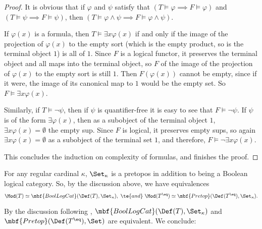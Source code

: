 \documentclass[11pt]{article}
\begin{document}
\begin{proof}
  It is obvious that if $\varphi$ and $\psi$ satisfy that $(T \models \varphi \implies F \models \varphi)$ and $(T \models \psi \implies F \models \psi)$, then $(T \models \varphi \land \psi \implies F \models \varphi \land \psi)$.

  If $\varphi(x)$ is a formula, then $T \models \exists x \varphi(x)$ if and only if the image of the projection of $\varphi(x)$ to the empty sort (which is the empty product, so is the terminal object $1$) is all of $1$. Since $F$ is a logical functor, it preserves the terminal object and all maps into the terminal object, so $F$ of the image of the projection of $\varphi(x)$ to the empty sort is still $1$. Then $F(\varphi(x))$ cannot be empty, since if it were, the image of its canonical map to $1$ would be the empty set. So $F \models \exists x \varphi(x)$.

  Similarly, if $T \models \neg \psi$, then if $\psi$ is quantifier-free it is easy to see that $F \models \neg \psi$. If $\psi$ is of the form $\exists \varphi(x)$, then as a subobject of the terminal object $1$, $\exists x \varphi(x) = \emptyset$ the empty sup. Since $F$ is logical, it preserves empty sups, so again $\exists x \varphi(x) = \emptyset$ as a subobject of the terminal set $1$, and therefore, $F \models \neg \exists x \varphi(x)$.

  This concludes the induction on complexity of formulas, and finishes the proof.
\end{proof}

  For any regular cardinal $\kappa$, $\Set_{\kappa}$ is a pretopos in addition to being a Boolean logical category. So, by the discussion above, we have equivalences
$$
\Mod(T) \simeq \mbf{BoolLogCat}(\Def(T), \Set_{\kappa}), \hspace{1mm} \te{ and } \hspace{1mm} \Mod(T^{\eq}) \simeq \mbf{Pretop}(\Def(T^{\eq}), \Set_{\kappa}).
$$

By the discussion following , $\mbf{BoolLogCat}(\Def(T),\Set_{\kappa})$ and $\mbf{Pretop}(\Def(T^{\eq}), \Set)$ are equivalent. We conclude:


\end{document}
